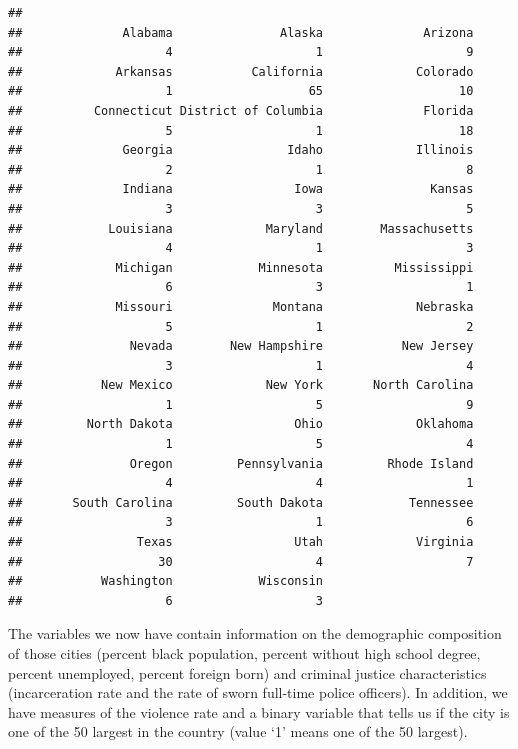 \documentclass[
]{book}
\begin{document}
\begin{verbatim}
## 
##              Alabama               Alaska              Arizona 
##                    4                    1                    9 
##             Arkansas           California             Colorado 
##                    1                   65                   10 
##          Connecticut District of Columbia              Florida 
##                    5                    1                   18 
##              Georgia                Idaho             Illinois 
##                    2                    1                    8 
##              Indiana                 Iowa               Kansas 
##                    3                    3                    5 
##            Louisiana             Maryland        Massachusetts 
##                    4                    1                    3 
##             Michigan            Minnesota          Mississippi 
##                    6                    3                    1 
##             Missouri              Montana             Nebraska 
##                    5                    1                    2 
##               Nevada        New Hampshire           New Jersey 
##                    3                    1                    4 
##           New Mexico             New York       North Carolina 
##                    1                    5                    9 
##         North Dakota                 Ohio             Oklahoma 
##                    1                    5                    4 
##               Oregon         Pennsylvania         Rhode Island 
##                    4                    4                    1 
##       South Carolina         South Dakota            Tennessee 
##                    3                    1                    6 
##                Texas                 Utah             Virginia 
##                   30                    4                    7 
##           Washington            Wisconsin 
##                    6                    3
\end{verbatim}

The variables we now have contain information on the demographic composition of those cities (percent black population, percent without high school degree, percent unemployed, percent foreign born) and criminal justice characteristics (incarceration rate and the rate of sworn full-time police officers). In addition, we have measures of the violence rate and a binary variable that tells us if the city is one of the 50 largest in the country (value `1' means one of the 50 largest).
\end{document}
